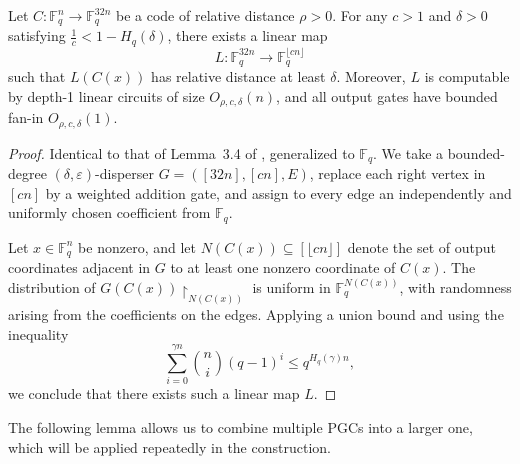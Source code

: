 \documentclass[11pt]{article}
\theoremstyle{named}
\begin{document}
\begin{lemma} 
\label{lem:rate_booster}	
Let $C:\mathbb{F}_q^n \to \mathbb{F}_q^{32n}$ be a code of relative distance $\rho > 0$.
For any $c > 1$ and $\delta > 0$ satisfying $\tfrac{1}{c} < 1 - H_q(\delta)$, there exists a
linear map
\[
L : \mathbb{F}_q^{32n} \to \mathbb{F}_q^{\lfloor cn \rfloor}
\]
such that $L(C(x))$ has relative distance at least $\delta$. Moreover, $L$ is computable by
depth-1 linear circuits of size $O_{\rho,c,\delta}(n)$, and all output gates have bounded
fan-in $O_{\rho,c,\delta}(1)$.
\end{lemma}
\begin{proof}
Identical to that of Lemma~3.4 of \cite{drucker2023minimum}, generalized to $\mathbb{F}_q$.
We take a bounded-degree $(\delta,\varepsilon)$-disperser $G=([32n],[cn],E)$, replace each right vertex in $[cn]$ by a weighted addition gate, and assign to every edge an independently and uniformly chosen coefficient from $\mathbb{F}_q$.

Let $x \in \mathbb{F}_q^n$ be nonzero, and let $N(C(x)) \subseteq [\lfloor cn \rfloor]$ denote the set of output coordinates adjacent in $G$ to at least one nonzero coordinate of $C(x)$.
The distribution of $G(C(x))\restriction_{N(C(x))}$ is uniform in $\mathbb{F}_q^{N(C(x))}$, with randomness arising from the coefficients on the edges. Applying a union bound and using the inequality
\begin{equation}
\label{equ:bsum_fq}
\sum_{i=0}^{\gamma n} \binom{n}{i}(q-1)^i \le q^{H_q(\gamma)n},
\end{equation}
we conclude that there exists such a linear map $L$.
\end{proof}


The following lemma allows us to combine multiple PGCs into a larger one, which will be applied repeatedly in the construction.
\end{document}
